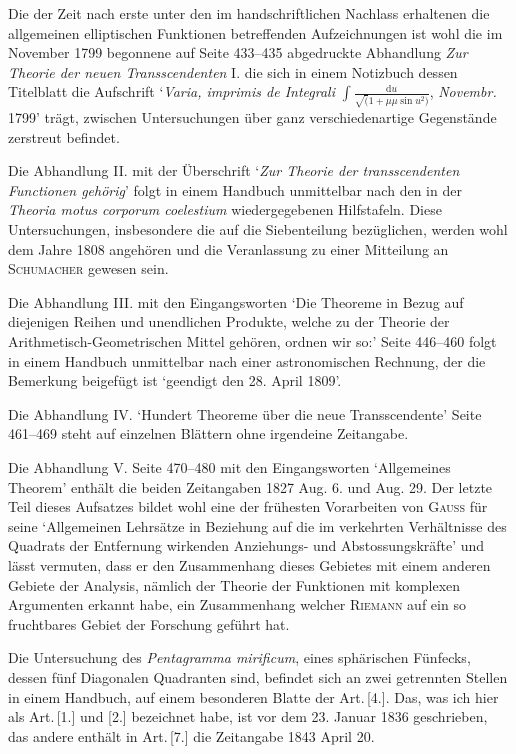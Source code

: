\medskip
Die der Zeit nach erste unter den im handschriftlichen Nachlass erhaltenen die allgemeinen elliptischen Funktionen betreffenden Aufzeichnungen ist wohl die im November 1799 begonnene auf Seite 433--435 abgedruckte Abhandlung \textit{Zur Theorie der neuen Transscendenten} I. die sich in einem Notizbuch dessen Titelblatt die Aufschrift `\textit{Varia, imprimis de Integrali} \(\displaystyle\int\frac{\mathrm{d}u}{\surd(1+\mu\mu\sin u^{2})}\), \textit{Novembr.} 1799' trägt, zwischen Untersuchungen über ganz verschiedenartige Gegenstände zerstreut befindet.

\medskip
Die Abhandlung II. mit der Überschrift `\textit{Zur Theorie der transscendenten Functionen gehörig}' folgt in einem Handbuch unmittelbar nach den in der \textit{Theoria motus corporum coelestium} wiedergegebenen Hilfstafeln. Diese Untersuchungen, insbesondere die auf die Siebenteilung bezüglichen, werden wohl dem Jahre 1808 angehören und die Veranlassung zu einer Mitteilung an \textsc{Schumacher} gewesen sein.

\medskip
Die Abhandlung III. mit den Eingangsworten `Die Theoreme in Bezug auf diejenigen Reihen und unendlichen Produkte, welche zu der Theorie der Arithmetisch-Geometrischen Mittel gehören, ordnen wir so:' Seite 446--460 folgt in einem Handbuch unmittelbar nach einer astronomischen Rechnung, der die Bemerkung beigefügt ist `geendigt den 28. April 1809'.

\medskip
Die Abhandlung IV. `Hundert Theoreme über die neue Transscendente' Seite 461--469 steht auf einzelnen Blättern ohne irgendeine Zeitangabe.

\medskip
Die Abhandlung V. Seite 470--480 mit den Eingangsworten `Allgemeines Theorem' enthält die beiden Zeitangaben 1827 Aug. 6. und Aug. 29. Der letzte Teil dieses Aufsatzes bildet wohl eine der frühesten Vorarbeiten von \textsc{Gauss} für seine `Allgemeinen Lehrsätze in Beziehung auf die im verkehrten Verhältnisse des Quadrats der Entfernung wirkenden Anziehungs- und Abstossungskräfte' und lässt vermuten, dass er den Zusammenhang dieses Gebietes mit einem anderen Gebiete der Analysis, nämlich der Theorie der Funktionen mit komplexen Argumenten erkannt habe, ein Zusammenhang welcher \textsc{Riemann} auf ein so fruchtbares Gebiet der Forschung geführt hat.

\medskip
Die Untersuchung des \textit{Pentagramma mirificum}, eines sphärischen Fünfecks, dessen fünf Diagonalen Quadranten sind, befindet sich an zwei getrennten Stellen in einem Handbuch, auf einem besonderen Blatte der Art.\,[4.]. Das, was ich hier als Art.\,[1.] und [2.] bezeichnet habe, ist vor dem 23. Januar 1836 geschrieben, das andere enthält in Art.\,[7.] die Zeitangabe 1843 April 20.

